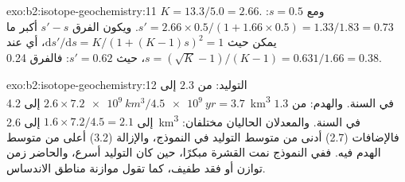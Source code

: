 \begin{solution}{exo:b2:isotope-geochemistry:11}
$K = 13.3/5.0 = 2.66$. ومع $s = 0.5$: $s' = 2.66\times0.5/(1 + 1.66\times0.5) =
1.33/1.83 = 0.73$. ويكون الفرق $s' - s$ أكبر ما يمكن حيث
$\mathrm{d}s'/\mathrm{d}s = K/(1+(K-1)s)^2 = 1$، أي عند $s = (\sqrt K - 1)/(K-1) =
0.631/1.66 = 0.38$، حيث $s' = 0.62$: فالفرق 0.24.
\end{solution}

\begin{solution}{exo:b2:isotope-geochemistry:12}
التوليد: من $2.3$ إلى $2.6\times\qty{7.2e9}{km^3}/\qty{4.5e9}{yr} = 3.7$ إلى
\qty{4.2}{km^3} في السنة. والهدم: من $1.3$ إلى $1.6\times7.2/4.5 = 2.1$ إلى
\qty{2.6}{km^3} في السنة. والمعدلان الحاليان مختلفان: فالإضافات (2.7) أدنى من متوسط
التوليد في النموذج، والإزالة (3.2) أعلى من متوسط الهدم فيه. ففي النموذج نمت القشرة
مبكرًا، حين كان التوليد أسرع، والحاضر زمن توازن أو فقد
طفيف، كما تقول موازنة مناطق الاندساس.
\end{solution}


